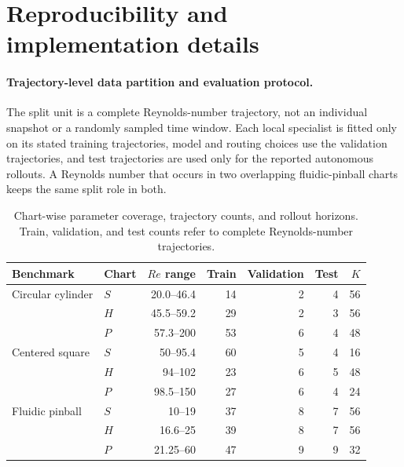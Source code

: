 \section{Reproducibility and implementation details}
\label{app:implementation}

\paragraph{Trajectory-level data partition and evaluation protocol.}
The split unit is a complete Reynolds-number trajectory, not an individual snapshot or a randomly sampled time window. Each local specialist is fitted only on its stated training trajectories, model and routing choices use the validation trajectories, and test trajectories are used only for the reported autonomous rollouts. A Reynolds number that occurs in two overlapping fluidic-pinball charts keeps the same split role in both.

\begin{table}[h]
\centering
\caption{Chart-wise parameter coverage, trajectory counts, and rollout horizons. Train, validation, and test counts refer to complete Reynolds-number trajectories.}
\label{tab:chart_splits}
\small
\setlength{\tabcolsep}{4pt}
\begin{tabular}{llrrrrr}
\toprule
Benchmark & Chart & $Re$ range & Train & Validation & Test & $K$ \\
\midrule
Circular cylinder & $S$ & 20.0--46.4 & 14 & 2 & 4 & 56 \\
                  & $H$ & 45.5--59.2 & 29 & 2 & 3 & 56 \\
                  & $P$ & 57.3--200  & 53 & 6 & 4 & 48 \\
\addlinespace
Centered square   & $S$ & 50--95.4   & 60 & 5 & 4 & 16 \\
                  & $H$ & 94--102    & 23 & 6 & 5 & 48 \\
                  & $P$ & 98.5--150  & 27 & 6 & 4 & 24 \\
\addlinespace
Fluidic pinball   & $S$ & 10--19     & 37 & 8 & 7 & 56 \\
                  & $H$ & 16.6--25   & 39 & 8 & 7 & 56 \\
                  & $P$ & 21.25--60  & 47 & 9 & 9 & 32 \\
\bottomrule
\end{tabular}
\end{table}

